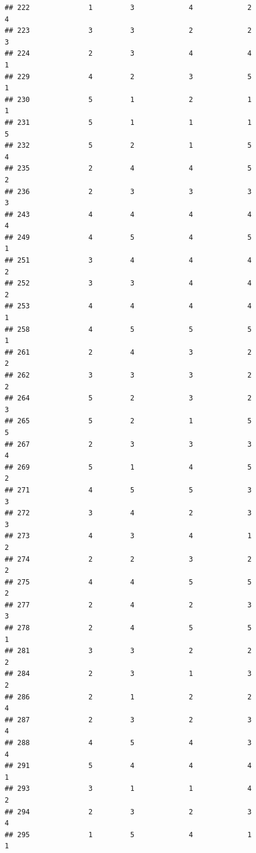 \documentclass[
]{article}
\begin{document}
\begin{verbatim}
## 222              1         3             4             2           4
## 223              3         3             2             2           3
## 224              2         3             4             4           1
## 229              4         2             3             5           1
## 230              5         1             2             1           1
## 231              5         1             1             1           5
## 232              5         2             1             5           4
## 235              2         4             4             5           2
## 236              2         3             3             3           3
## 243              4         4             4             4           4
## 249              4         5             4             5           1
## 251              3         4             4             4           2
## 252              3         3             4             4           2
## 253              4         4             4             4           1
## 258              4         5             5             5           1
## 261              2         4             3             2           2
## 262              3         3             3             2           2
## 264              5         2             3             2           3
## 265              5         2             1             5           5
## 267              2         3             3             3           4
## 269              5         1             4             5           2
## 271              4         5             5             3           3
## 272              3         4             2             3           3
## 273              4         3             4             1           2
## 274              2         2             3             2           2
## 275              4         4             5             5           2
## 277              2         4             2             3           3
## 278              2         4             5             5           1
## 281              3         3             2             2           2
## 284              2         3             1             3           2
## 286              2         1             2             2           4
## 287              2         3             2             3           4
## 288              4         5             4             3           4
## 291              5         4             4             4           1
## 293              3         1             1             4           2
## 294              2         3             2             3           4
## 295              1         5             4             1           1

\end{verbatim}
\end{document}
